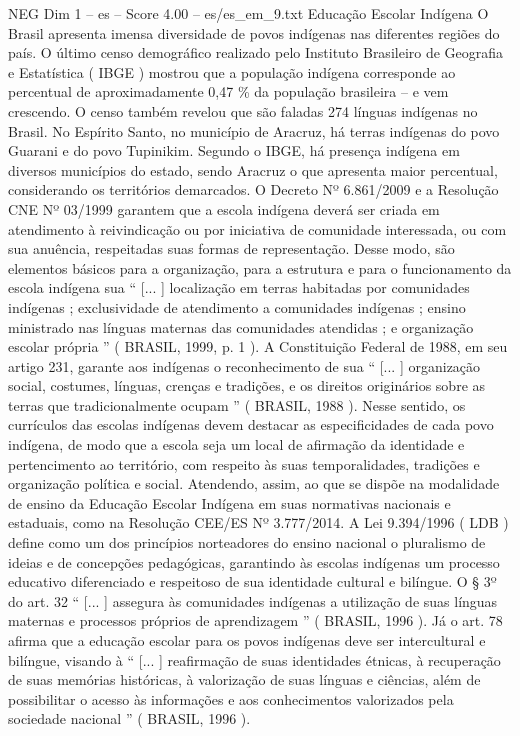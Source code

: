 \begin{textsample}{NEG Dim 1 – es – Score 4.00 – es/es\_em\_9.txt}  \label{ex:f1_neg_100}
Educação Escolar Indígena O Brasil apresenta imensa diversidade de povos indígenas nas diferentes regiões do país.
O último censo demográfico realizado pelo Instituto Brasileiro de Geografia e Estatística ( IBGE ) mostrou que a população indígena corresponde ao percentual de aproximadamente 0,47 \% da população brasileira – e vem crescendo.
O censo também revelou que são faladas 274 línguas indígenas no Brasil.
No Espírito Santo, no município de Aracruz, há terras indígenas do povo Guarani e do povo Tupinikim.
Segundo o IBGE, há presença indígena em diversos municípios do estado, sendo Aracruz o que apresenta maior percentual, considerando os territórios demarcados.
O Decreto Nº 6.861/2009 e a Resolução CNE Nº 03/1999 garantem que a escola indígena deverá ser criada em atendimento à reivindicação ou por iniciativa de comunidade interessada, ou com sua anuência, respeitadas suas formas de representação.
Desse modo, são elementos básicos para a organização, para a estrutura e para o funcionamento da escola indígena sua “ [... ] localização em terras habitadas por comunidades indígenas ; exclusividade de atendimento a comunidades indígenas ; ensino ministrado nas línguas maternas das comunidades atendidas ; e organização escolar própria ” ( BRASIL, 1999, p. 1 ).
A Constituição Federal de 1988, em seu artigo 231, garante aos indígenas o reconhecimento de sua “ [... ] organização social, costumes, línguas, crenças e tradições, e os direitos originários sobre as terras que tradicionalmente ocupam ” ( BRASIL, 1988 ).
Nesse sentido, os currículos das escolas indígenas devem destacar as especificidades de cada povo indígena, de modo que a escola seja um local de afirmação da identidade e pertencimento ao território, com respeito às suas temporalidades, tradições e organização política e social.
Atendendo, assim, ao que se dispõe na modalidade de ensino da Educação Escolar Indígena em suas normativas nacionais e estaduais, como na Resolução CEE/ES Nº 3.777/2014.
A Lei 9.394/1996 ( LDB ) define como um dos princípios norteadores do ensino nacional o pluralismo de ideias e de concepções pedagógicas, garantindo às escolas indígenas um processo educativo diferenciado e respeitoso de sua identidade cultural e bilíngue.
O § 3º do art. 32 “ [... ] assegura às comunidades indígenas a utilização de suas línguas maternas e processos próprios de aprendizagem ” ( BRASIL, 1996 ).
Já o art. 78 afirma que a educação escolar para os povos indígenas deve ser intercultural e bilíngue, visando à “ [... ] reafirmação de suas identidades étnicas, à recuperação de suas memórias históricas, à valorização de suas línguas e ciências, além de possibilitar o acesso às informações e aos conhecimentos valorizados pela sociedade nacional ” ( BRASIL, 1996 ).

\end{textsample}
